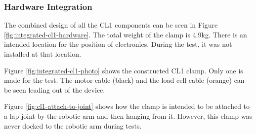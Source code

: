 \subsubsection{Hardware Integration}
\label{subsubsection:exploration-1-hardware-integration}

The combined design of all the CL1 components can be seen in Figure \ref{fig:integrated-cl1-hardware}. The total weight of the clamp is 4.9kg. There is an intended location for the position of electronics. During the test, it was not installed at that location.

Figure \ref{fig:integrated-cl1-photo} shows the constructed CL1 clamp. Only one is made for the test. The motor cable (black) and the load cell cable (orange) can be seen leading out of the device.

Figure \ref{fig:cl1-attach-to-joint} shows how the clamp is intended to be attached to a lap joint by the robotic arm and then hanging from it. However, this clamp was never docked to the robotic arm during tests.

